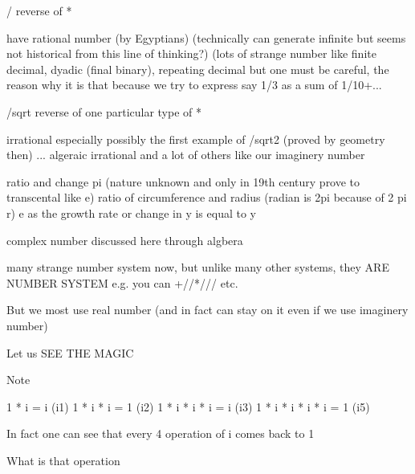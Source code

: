 \documentclass[letterpaper,10pt,english]{jupyterBook}
\begin{document}
\begin{sphinxVerbatim}[commandchars=\\\{\}]
    / reverse of *
    
        have rational number (by Egyptians) 
        (technically can generate infinite but seems not historical from this line of thinking?)
        (lots of strange number like finite decimal, dyadic (final binary), repeating decimal
            but one must be careful, the reason why it is that because we try to express say
            1/3 as a sum of 1/10+...
    
    /sqrt reverse of one particular type of * 
    
        irrational especially possibly the first example of \PYGZdl{}/sqrt\PYGZob{}2\PYGZcb{}\PYGZdl{}
            (proved by geometry then)         
        ... algeraic irrational and a lot of others like our imaginery number
    
    ratio and change
        pi (nature unknown and only in 19th century prove to transcental like e)
        ratio of circumference and radius (radian is 2pi because of 2 pi r)
        e as the growth rate or change in y is equal to y 
    
    complex number 
        discussed here through algbera
    
    many strange number system now, but unlike many other systems, 
        they ARE NUMBER SYSTEM e.g. you can +/\PYGZhy{}/*///\PYGZca{} etc.
    
    But we most use real number (and in fact can stay on it even if we use imaginery number)
    
    


Let us SEE THE MAGIC
\end{sphinxVerbatim}

\begin{sphinxVerbatim}[commandchars=\\\{\}]
Note

    1 * i             = i         (i\PYGZca{}1)
    1 * i * i         = \PYGZhy{}1        (i\PYGZca{}2)
    1 * i * i * i     = \PYGZhy{}i        (i\PYGZca{}3)
    1 * i * i * i * i = 1         (i\PYGZca{}5)
    
In fact one can see that every 4 operation of i comes back to 1

What is that operation
\end{sphinxVerbatim}
\end{document}
